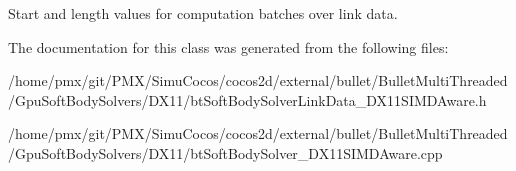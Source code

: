 Start and length values for computation batches over link data. 

The documentation for this class was generated from the following files\+:\begin{DoxyCompactItemize}
\item 
/home/pmx/git/\+P\+M\+X/\+Simu\+Cocos/cocos2d/external/bullet/\+Bullet\+Multi\+Threaded/\+Gpu\+Soft\+Body\+Solvers/\+D\+X11/bt\+Soft\+Body\+Solver\+Link\+Data\+\_\+\+D\+X11\+S\+I\+M\+D\+Aware.\+h\item 
/home/pmx/git/\+P\+M\+X/\+Simu\+Cocos/cocos2d/external/bullet/\+Bullet\+Multi\+Threaded/\+Gpu\+Soft\+Body\+Solvers/\+D\+X11/bt\+Soft\+Body\+Solver\+\_\+\+D\+X11\+S\+I\+M\+D\+Aware.\+cpp\end{DoxyCompactItemize}
